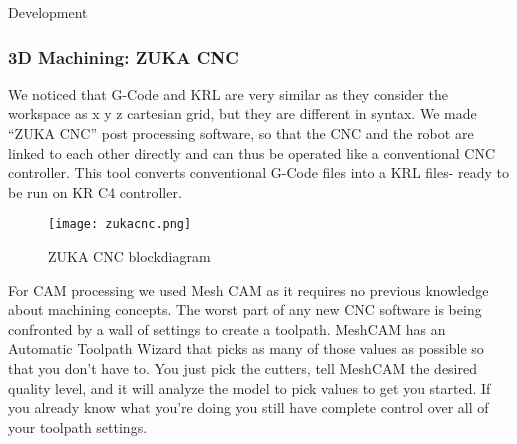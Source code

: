 \documentclass[a4paper]{book}
\begin{document}
\begin{chapter}{Development}
\subsubsection{3D Machining: ZUKA CNC }
We noticed that G-Code and KRL are very similar as they consider the workspace as x y z cartesian grid, but they are different in syntax. We made “ZUKA CNC” post processing software, so that the CNC and the robot are linked to each other directly and can thus be operated like a conventional CNC controller. This tool converts conventional G-Code files into a KRL files- ready to be run on KR C4 controller.
\begin{figure}[ht]
	\centering
	\caption{ZUKA CNC blockdiagram}
	\texttt{[image: zukacnc.png]}
\end{figure}
For CAM processing we used Mesh CAM as it requires no previous knowledge about machining concepts. The worst part of any new CNC software is being confronted by a wall of settings to create a toolpath. MeshCAM has an Automatic Toolpath Wizard that picks as many of those values as possible so that you don't have to. You just pick the cutters, tell MeshCAM the desired quality level, and it will analyze the model to pick values to get you started. If you already know what you're doing you still have complete control over all of your toolpath settings.

\end{chapter}
\end{document}
